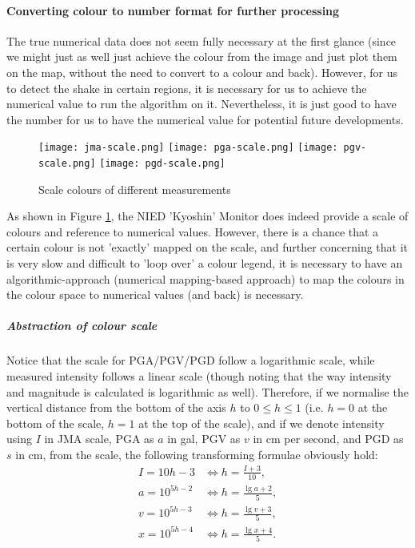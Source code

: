

\paragraph{Converting colour to number format for further processing}

The true numerical data does not seem fully necessary at the first glance (since we might just as well just achieve the colour from the image and just plot them on the map, without the need to convert to a colour and back). However, for us to detect the shake in certain regions, it is necessary for us to achieve the numerical value to run the algorithm on it. Nevertheless, it is just good to have the number for us to have the numerical value for potential future developments.

\begin{figure}[!ht]
    \centering
    \texttt{[image: jma-scale.png]}
    \texttt{[image: pga-scale.png]}
    \texttt{[image: pgv-scale.png]}
    \texttt{[image: pgd-scale.png]}
    \caption{Scale colours of different measurements}
    \label{fig:scale-colour}
\end{figure}

As shown in Figure \ref{fig:scale-colour}, the NIED 'Kyoshin' Monitor does indeed provide a scale of colours and reference to numerical values. However, there is a chance that a certain colour is not 'exactly' mapped on the scale, and further concerning that it is very slow and difficult to 'loop over' a colour legend, it is necessary to have an algorithmic-approach (numerical mapping-based approach) to map the colours in the colour space to numerical values (and back) is necessary.

\subparagraph{Abstraction of colour scale}

Notice that the scale for PGA/PGV/PGD follow a logarithmic scale, while measured intensity follows a linear scale (though noting that the way intensity and magnitude is calculated is logarithmic as well). Therefore, if we normalise the vertical distance from the bottom of the axis \(h\) to \(0 \leq h \leq 1\) (i.e. \(h = 0\) at the bottom of the scale, \(h = 1\) at the top of the scale), and if we denote intensity using \(I\) in JMA scale, PGA as \(a\) in gal, PGV as \(v\) in cm per second, and PGD as \(s\) in cm, from the scale, the following transforming formulae obviously hold:
\begin{align*}
    I  = 10h - 3     & \iff h      = \frac{I + 3}{10}, \\
    a  = 10^{5h - 2} & \iff h  = \frac{\lg a + 2}{5},  \\
    v  = 10^{5h - 3} & \iff h  = \frac{\lg v + 3}{5},  \\
    x  = 10^{5h - 4} & \iff h  = \frac{\lg x + 4}{5}.  \\
\end{align*}

